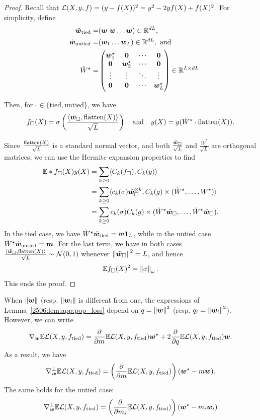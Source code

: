 \begin{proof}
  Recall that $\mathcal{L}(X, y, f) = (y - f(X))^2 = y^2 - 2yf(X) + f(X)^2$. For simplicity, define
\[\begin{split} \tilde{{\boldsymbol{w}}}_{\text{tied}} =& ({\boldsymbol{w}}\  {\boldsymbol{w}} \dots {\boldsymbol{w}})\in \mathbb{R}^{dL},\\ \quad \tilde{{\boldsymbol{w}}}_{\text{untied}} =& ({\boldsymbol{w}}_1 \dots {\boldsymbol{w}}_L)\in \mathbb{R}^{dL}, \text{ and} \\ \tilde W^\star =& \begin{pmatrix}
    {\boldsymbol{w}}_1^\star & {\boldsymbol{0}} & \cdots & {\boldsymbol{0}} \\
    {\boldsymbol{0}} & {\boldsymbol{w}}_2^\star & \cdots & {\boldsymbol{0}} \\
    \vdots & \vdots & \ddots & \vdots \\
    {\boldsymbol{0}} & {\boldsymbol{0}} & \cdots & {\boldsymbol{w}}_L^\star 
\end{pmatrix} \in \mathbb{R}^{L \times dL} \end{split}\]

Then, for $\square \in \{ \text{tied}, \text{untied}\}$, we have 
\[ f_\square(X) = \sigma\left(\frac{\langle \tilde{{\boldsymbol{w}}}_\square, \operatorname{flatten}(X) \rangle}{\sqrt{L}}\right)\quad \text{and} \quad y(X) = g(\tilde W^\star \cdot \operatorname{flatten}(X)).\]

Since $\frac{\operatorname{flatten}(X)}{\sqrt{L}}$ is a standard normal vector, and both $\frac{\tilde {{\boldsymbol{w}}}_\square}{\sqrt{L}}$ and $\frac{\tilde W^\star}{\sqrt{L}}$ are orthogonal matrices, we can use the Hermite expansion properties to find
\begin{align*}
    \mathbb{E}*{f_\square(X) y(X)} &= \sum_{k \geq 0} \langle C_k(f_\square), C_k(y) \rangle \\
    &= \sum_{k \geq 0} \langle c_k(\sigma) \tilde{{\boldsymbol{w}}}_\square^{\otimes k}, C_k(g) \times (\tilde W^\star, \dots, W^\star) \rangle \\
    &= \sum_{k \geq 0} c_k(\sigma) C_k(g) \times (\tilde W^\star \tilde{{\boldsymbol{w}}}_\square, \dots, \tilde W^\star \tilde{{\boldsymbol{w}}}_\square).
\end{align*}
In the tied case, we have $\tilde W^\star \tilde {{\boldsymbol{w}}}_{\text{tied}} = m \mathbf{1}_L$, while in the untied case $\tilde W^\star \tilde {{\boldsymbol{w}}}_{\text{untied}} = {\boldsymbol{m}}$.
For the last term, we have in both cases $\frac{\langle \tilde{{\boldsymbol{w}}}_\square, \operatorname{flatten}(X) \rangle}{\sqrt{L}} \sim \mathcal{N}(0, 1)$ whenever $\left\lVert \tilde {{\boldsymbol{w}}}_\square\right\rVert^2 = L$, and hence 
\[ \mathbb{E}{f_\square(X)^2} = \left\lVert \sigma\right\rVert_\omega. \]
This ends the proof.
\end{proof}

When $\left\lVert {\boldsymbol{w}}\right\rVert$ (resp. $\left\lVert {\boldsymbol{w}}_i\right\rVert$ is different from one, the expressions of Lemma~\ref{2506:lem:app:pop_loss} depend on $q = \left\lVert {\boldsymbol{w}}\right\rVert^2$ (resp. $q_i = \left\lVert {\boldsymbol{w}}_i\right\rVert^2$). However, we can write
\[ \nabla_{{\boldsymbol{w}}}\mathbb{E}{\mathcal{L}(X, y, f_{\text{tied}})} = \frac{\partial}{\partial m}\mathbb{E}{\mathcal{L}(X, y, f_{\text{tied}})} {\boldsymbol{w}}^\star + 2\frac{\partial}{\partial q}\mathbb{E}{\mathcal{L}(X, y, f_{\text{tied}})} {\boldsymbol{w}}. \]
As a result, we have
\[ \nabla_{{\boldsymbol{w}}}^\bot\mathbb{E}{\mathcal{L}(X, y, f_{\text{tied}})} = \left(\frac{\partial}{\partial m}\mathbb{E}{\mathcal{L}(X, y, f_{\text{tied}})}\right) ({\boldsymbol{w}}^\star - m {\boldsymbol{w}}). \]
The same holds for the untied case:
\[ \nabla_{{\boldsymbol{w}}}^\bot\mathbb{E}{\mathcal{L}(X, y, f_{\text{tied}})} = \left(\frac{\partial}{\partial m_i}\mathbb{E}{\mathcal{L}(X, y, f_{\text{tied}})}\right) ({\boldsymbol{w}}^\star - m_i {\boldsymbol{w}}_i)\]

